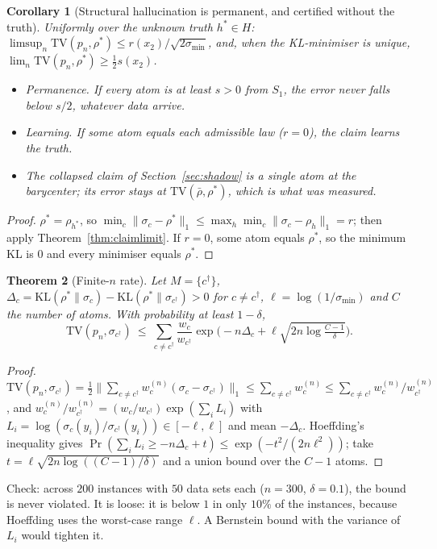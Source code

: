 \documentclass[11pt]{article}
\newtheorem{theorem}{Theorem}[section]
\newtheorem{corollary}[theorem]{Corollary}
\theoremstyle{definition}
\theoremstyle{remark}
\begin{document}
\begin{corollary}[Structural hallucination is permanent, and certified without the truth]\label{cor:permanent}
Uniformly over the unknown truth $h^*\in H$: $\limsup_n\mathrm{TV}(p_n,\rho^*)\le r(x_2)/\sqrt{2\sigma_{\min}}$, and, when the KL-minimiser is unique, $\lim_n\mathrm{TV}(p_n,\rho^*)\ge\frac12 s(x_2)$.
\begin{itemize}
  \item \emph{Permanence.} If every atom is at least $s>0$ from $S_1$, the error never falls below $s/2$, whatever data arrive.
  \item \emph{Learning.} If some atom equals each admissible law ($r=0$), the claim learns the truth.
  \item \emph{The collapsed claim} of Section~\ref{sec:shadow} is a single atom at the barycenter; its error stays at $\mathrm{TV}(\bar\rho,\rho^*)$, which is what was measured.
\end{itemize}
\end{corollary}
\begin{proof}
$\rho^*=\rho_{h^*}$, so $\min_c\|\sigma_c-\rho^*\|_1\le\max_h\min_c\|\sigma_c-\rho_h\|_1=r$; then apply Theorem~\ref{thm:claimlimit}. If $r=0$, some atom equals $\rho^*$, so the minimum KL is $0$ and every minimiser equals $\rho^*$.
\end{proof}

\begin{theorem}[Finite-$n$ rate]\label{thm:claimrate}
Let $M=\{c^\dagger\}$, $\Delta_c=\mathrm{KL}(\rho^*\|\sigma_c)-\mathrm{KL}(\rho^*\|\sigma_{c^\dagger})>0$ for $c\ne c^\dagger$, $\ell=\log(1/\sigma_{\min})$ and $C$ the number of atoms. With probability at least $1-\delta$,
\[\mathrm{TV}(p_n,\sigma_{c^\dagger})\ \le\ \sum_{c\ne c^\dagger}\frac{w_c}{w_{c^\dagger}}\exp\!\Big(-n\Delta_c+\ell\sqrt{2n\log\tfrac{C-1}{\delta}}\Big).\]
\end{theorem}
\begin{proof}
$\mathrm{TV}(p_n,\sigma_{c^\dagger})=\frac12\|\sum_{c\ne c^\dagger}w^{(n)}_c(\sigma_c-\sigma_{c^\dagger})\|_1\le\sum_{c\ne c^\dagger}w^{(n)}_c\le\sum_{c\ne c^\dagger}w^{(n)}_c/w^{(n)}_{c^\dagger}$, and $w^{(n)}_c/w^{(n)}_{c^\dagger}=(w_c/w_{c^\dagger})\exp(\sum_iL_i)$ with $L_i=\log(\sigma_c(y_i)/\sigma_{c^\dagger}(y_i))\in[-\ell,\ell]$ and mean $-\Delta_c$. Hoeffding's inequality \cite{hoeffding63} gives $\Pr(\sum_iL_i\ge-n\Delta_c+t)\le\exp(-t^2/(2n\ell^2))$; take $t=\ell\sqrt{2n\log((C-1)/\delta)}$ and a union bound over the $C-1$ atoms.
\end{proof}
Check: across $200$ instances with $50$ data sets each ($n=300$, $\delta=0.1$), the bound is never violated. It is loose: it is below $1$ in only $10\%$ of the instances, because Hoeffding uses the worst-case range $\ell$. A Bernstein bound with the variance of $L_i$ would tighten it.
\end{document}
